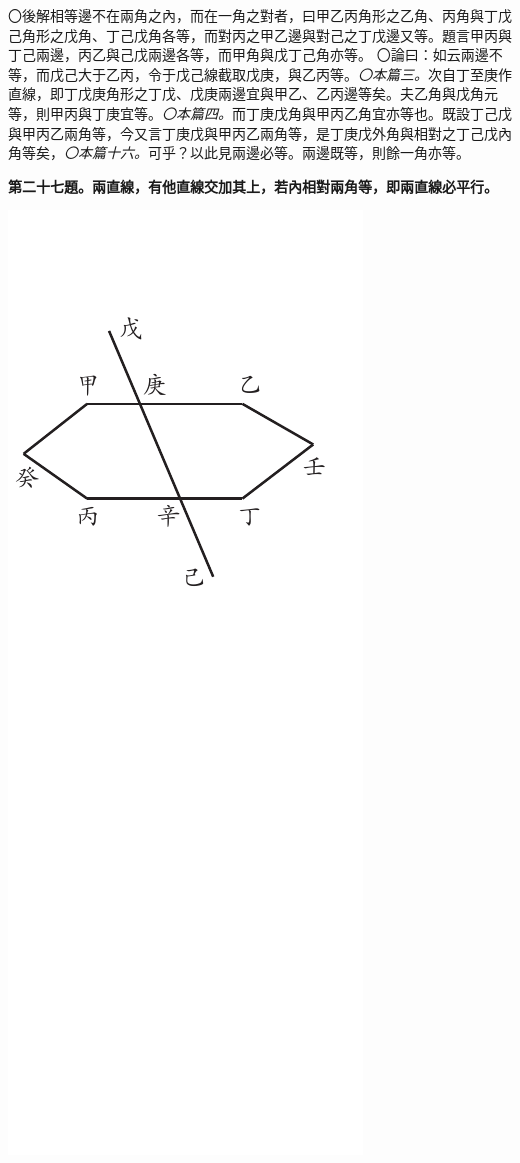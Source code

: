 \documentclass[12pt,b5paper,landscape]{article}
\newcommand{\ccom}[1]{{\footnotesize \emph{〇#1}}}
\newcommand{\bcom}[1]{〇#1}
\newcommand{\cthm}[1]{{
\vspace{8pt}

\bfseries #1}}
\begin{document}
\begin{multicols}{2}
\begin{center}
\end{center}
\bcom{後解相等邊不在兩角之內，而在一角之對者，曰甲乙丙角形之乙角、丙角與丁戊己角形之戊角、丁己戊角各等，而對丙之甲乙邊與對己之丁戊邊又等。題言甲丙與丁己兩邊，丙乙與己戊兩邊各等，而甲角與戊丁己角亦等。}
\bcom{論曰：如云兩邊不等，而戊己大于乙丙，令于戊己線截取戊庚，與乙丙等。\ccom{本篇三。}次自丁至庚作直線，即丁戊庚角形之丁戊、戊庚兩邊宜與甲乙、乙丙邊等矣。夫乙角與戊角元等，則甲丙與丁庚宜等。\ccom{本篇四。}而丁庚戊角與甲丙乙角宜亦等也。既設丁己戊與甲丙乙兩角等，今又言丁庚戊與甲丙乙兩角等，是丁庚戊外角與相對之丁己戊內角等矣，\ccom{本篇十六。}可乎？以此見兩邊必等。兩邊既等，則餘一角亦等。}

\cthm{第二十七題。兩直線，有他直線交加其上，若內相對兩角等，即兩直線必平行。}
\begin{center}
      \includegraphics[angle=90]{eu74}

\end{center}
\end{multicols}
\end{document}
